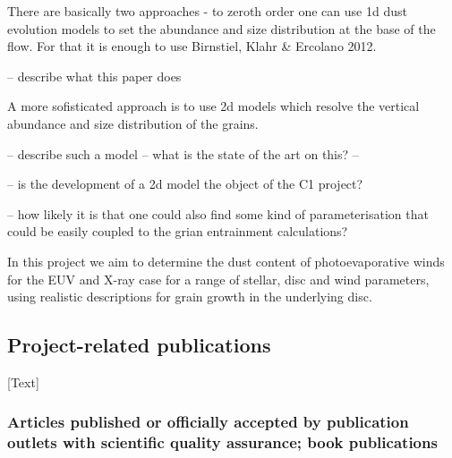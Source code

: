 \documentclass[10pt,fleqn,twoside]{article}
\newcommand{\Tcol}{\color{blue}}
\begin{document}
{\color{green}There are basically two approaches - to zeroth order one
  can use 1d dust evolution models to set the abundance and size
  distribution at the base of the flow. For that it is enough to use
  Birnstiel, Klahr \& Ercolano 2012. 

-- describe what this paper does 

A more sofisticated approach is to use 2d models which resolve the
vertical abundance and size distribution of the grains. 

-- describe such a model -- what is the state of the art on this? -- 

-- is the development of a 2d model the  object of the C1 project? 

-- how likely it is that one could also find some kind of
parameterisation that could be easily coupled to the grian entrainment calculations?
}

In this project
we aim to determine the dust content of photoevaporative winds for the
EUV and X-ray case for a range of stellar, disc and wind parameters,
using realistic descriptions for grain growth in the underlying
disc. 


\subsection{\Tcol Project-related publications}

[Text]

\subsubsection{\Tcol 
Articles published or officially accepted by publication outlets with scientific quality assurance;
book publications}
\end{document}
